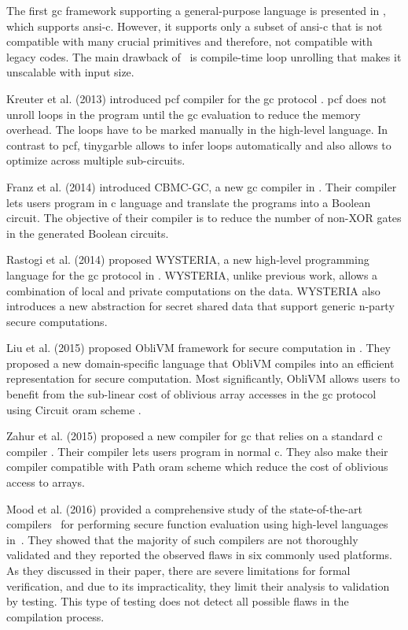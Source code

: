 The first \acrshort{gc} framework supporting a general-purpose language is presented in \cite{holzer2012secure}, which supports \acrshort{ansi}-\gls{c}.
However, it supports only a subset of \acrshort{ansi}-\gls{c} that is not compatible with many crucial primitives and therefore, not compatible with legacy codes.
The main drawback of~\cite{holzer2012secure} is compile-time loop unrolling that makes it unscalable with input size.

Kreuter et al. (2013) introduced \gls{pcf} compiler for the \acrshort{gc} protocol \cite{kreuter2013pcf}.
\gls{pcf} does not unroll loops in the program until the \acrshort{gc} evaluation to reduce the memory overhead.
The loops have to be marked manually in the high-level language.
In contrast to \gls{pcf}, \gls{tinygarble} allows to infer loops automatically and also allows to optimize across multiple sub-circuits.

Franz et al. (2014) introduced CBMC-GC, a new \acrshort{gc} compiler in \cite{franz2014cbmc}.
Their compiler lets users program in \gls{c} language and translate the programs into a Boolean circuit.
The objective of their compiler is to reduce the number of non-XOR gates in the generated Boolean circuits.

Rastogi et al. (2014) proposed WYSTERIA, a new high-level programming language for the \acrshort{gc} protocol in \cite{rastogi2014wysteria}.
WYSTERIA, unlike previous work, allows a combination of local and private computations on the data.
WYSTERIA also introduces a new abstraction for secret shared data that support generic n-party secure computations.

Liu et al. (2015) proposed ObliVM framework for secure computation in \cite{liu2015oblivm}.
They proposed a new domain-specific language that ObliVM compiles into an efficient representation for secure computation.
Most significantly, ObliVM allows users to benefit from the sub-linear cost of oblivious array accesses in the \acrshort{gc} protocol using Circuit \acrfull{oram} scheme \cite{wang2015circuit}.

Zahur et al. (2015) proposed a new compiler for \acrshort{gc} that relies on a standard \gls{c} compiler \cite{zahur2015obliv}.
Their compiler lets users program in normal \gls{c}.
They also make their compiler compatible with Path \acrshort{oram} scheme \cite{stefanov2013path} which reduce the cost of oblivious access to arrays.

Mood et al. (2016) provided a comprehensive study of the state-of-the-art compilers~\cite{mood2012memory,kreuter2012billion,kreuter2013pcf, franz2014cbmc,zahur2015obliv,liu2015oblivm} for performing secure function evaluation using high-level languages in~\cite{mood2016frigate}.
They showed that the majority of such compilers are not thoroughly validated and they reported the observed flaws in six commonly used platforms.
As they discussed in their paper, there are severe limitations for formal verification, and due to its impracticality, they limit their analysis to validation by testing.
This type of testing does not detect all possible flaws in the compilation process.


